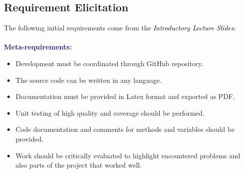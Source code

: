 \documentclass{article}
\begin{document}
	
	\subsection{Requirement Elicitation}	
	
	
	The following initial requirements come from the \textcolor{black}{\emph{Introductory Lecture Slides:}}\\\\
	{\bf\textcolor{MidnightBlue}{Meta-requirements:}}
	\begin{itemize}
		
		\item Development must be coordinated through GitHub repository.
		\item The source code can be written in any language.
		\item Documentation must be provided in Latex format and exported as PDF.
		\item Unit testing of high quality and coverage should be performed.
		\item Code documentation and comments for methods and variables should be provided.
		\item Work should be critically evaluated to highlight encountered problems and also parts of the project that worked well.
	\end{itemize}
	
\end{document}
